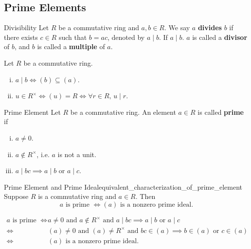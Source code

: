 \subsection{Prime Elements}
\begin{definition}{Divisibility}{}
    Let $R$ be a commutative ring and $a,b\in R$. We say $a$ \textbf{divides} $b$ if there exists $c\in R$ such that $b=ac$, denoted by $a\mid b$. If $a\mid b$. $a$ is called a \textbf{divisor} of $b$, and $b$ is called a \textbf{multiple} of $a$.
\end{definition}


\begin{proposition}{}{}
    Let $R$ be a commutative ring.
    \begin{enumerate}[(i)]
        \item $a \mid b\iff(b) \subseteq (a)$.
        \item $u\in R^\times \iff (u) = R  \iff \forall r\in R,\,u\mid r$.
    \end{enumerate}
\end{proposition}

\begin{definition}{Prime Element}{}
    Let $R$ be a commutative ring. An element $a\in R$ is called \textbf{prime} if
    \begin{enumerate}[(i)]
        \item $a\ne 0$.
        \item $a\notin R^\times$, i.e. $a$ is not a unit.
        \item $a\mid bc\implies a\mid b\text{ or }a\mid c$.
    \end{enumerate}
\end{definition}



\begin{proposition}{Prime Element and Prime Ideal}{equivalent_characterization_of_prime_element}
    Suppose $R$ is a commutative ring and $a\in R$. Then
    \[
        a\text{ is prime }\iff (a)\text{ is a nonzero prime ideal}.
    \]
\end{proposition}

\begin{prf}
    \begin{align*}
        a\text{ is prime }\iff &a\ne 0\text{ and }a\notin R^\times\text{ and }a\mid bc\implies a\mid b\text{ or }a\mid c\\
        \iff &(a)\ne 0\text{ and }(a)\ne R^\times\text{ and }bc\in (a)\implies b\in (a)\text{ or }c\in (a)\\
        \iff &(a)\text{ is a nonzero prime ideal}.
    \end{align*}
\end{prf}

